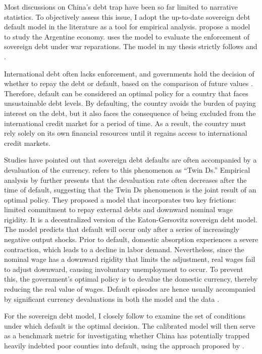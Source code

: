 Most discussions on China's debt trap have been so far limited to narrative statistics.
To objectively assess this issue, I adopt the up-to-date sovereign debt default model in the literature as a tool for empirical analysis. \citet{Na-18} propose a model to study the Argentine economy. \citet*{Hinrichsen_2020-chapter4} uses the model to evaluate the enforcement of sovereign debt under war reparations.
The model in my thesis strictly follows \citet{Na-18} and \citet*{Hinrichsen_2020-chapter4}.

International debt often lacks enforcement, and governments hold the decision of whether to repay the debt or default, based on the comparison of future values \citep*{Eaton-Gersovitz-81}. Therefore, default can be considered an optimal policy for a country that faces unsustainable debt levels. By defaulting, the country avoids the burden of paying interest on the debt, but it also faces the consequence of being excluded from the international credit market for a period of time. As a result, the country must rely solely on its own financial resources until it regains access to international credit markets.

Studies have pointed out that sovereign debt defaults are often accompanied by a devaluation of the currency. \citet*{Reinhart02} refers to this phenomenon as ``Twin Ds.''
Empirical analysis by \citet{Na-18} further presents that the devaluation rate often decreases after the time of default, suggesting that the Twin Ds phenomenon is the joint result of an optimal policy.
They proposed a model that incorporates two key frictions: limited commitment to repay external debts and downward nominal wage rigidity.
It is a decentralized version of the Eaton-Gersovitz sovereign debt model.
The model predicts that default will occur only after a series of increasingly negative output shocks. Prior to default, domestic absorption experiences a severe contraction, which leads to a decline in labor demand. Nevertheless, since the nominal wage has a downward rigidity that limits the adjustment, real wages fail to adjust downward, causing involuntary unemployment to occur. To prevent this, the government's optimal policy is to devalue the domestic currency, thereby reducing the real value of wages. Default episodes are hence usually accompanied by significant currency devaluations in both the model and the data \citep{Na-18}.

For the sovereign debt model, I closely follow \citet{Na-18} to examine the set of conditions under which default is the optimal decision.
The calibrated model will then serve as a benchmark metric for investigating whether China has potentially trapped heavily indebted poor counties into default, using the approach proposed by \citet*{Hinrichsen_2020-chapter4}.

